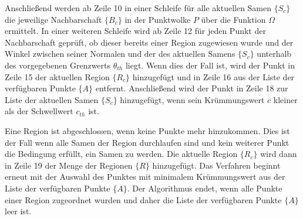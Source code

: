 Anschließend werden ab Zeile 10 in einer Schleife für alle aktuellen Samen $ \{S_c\} $ die jeweilige Nachbarschaft $ \{B_c\} $ in der Punktwolke $ P $ über die Funktion $ \Omega $ ermittelt. In einer weiteren Schleife wird ab Zeile 12 für jeden Punkt der Nachbarschaft geprüft, ob dieser bereits einer Region zugewiesen wurde und der Winkel zwischen seiner Normalen und der des aktuellen Samens $ \{S_c\} $ unterhalb des vorgegebenen Grenzwerts $ \theta_{th} $ liegt. Wenn dies der Fall ist, wird der Punkt in Zeile 15 der aktuellen Region $ \{R_c\} $ hinzugefügt und in Zeile 16 aus der Liste der verfügbaren Punkte $ \{A\} $ entfernt. Anschließend wird der Punkt in Zeile 18 zur Liste der aktuellen Samen $ \{S_c\} $ hinzugefügt, wenn sein Krümmungswert $ c $ kleiner als der Schwellwert $ c_{th} $ ist. 

Eine Region ist abgeschlossen, wenn keine Punkte mehr hinzukommen. Dies ist der Fall wenn alle Samen der Region durchlaufen sind und kein weiterer Punkt die Bedingung erfüllt, ein Samen zu werden. Die aktuelle Region $ \{R_c\} $ wird dann in Zeile  19 der Menge der Regionen $ \{R\} $ hinzugefügt. Das Verfahren beginnt erneut mit der Auswahl des Punktes mit minimalem Krümmungswert aus der Liste der verfügbaren Punkte $ \{A\} $. Der Algorithmus endet, wenn alle Punkte einer Region zugeordnet wurden und daher die Liste der verfügbaren Punkte $ \{A\} $ leer ist. 


